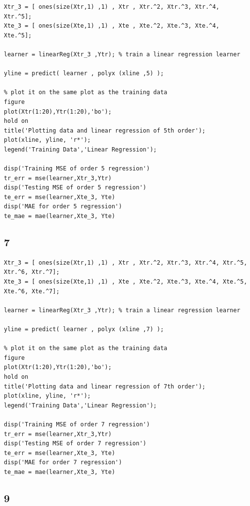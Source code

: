 \documentclass{article}
\begin{document}
\begin{verbatim}
Xtr_3 = [ ones(size(Xtr,1) ,1) , Xtr , Xtr.^2, Xtr.^3, Xtr.^4, Xtr.^5];
Xte_3 = [ ones(size(Xte,1) ,1) , Xte , Xte.^2, Xte.^3, Xte.^4, Xte.^5];

learner = linearReg(Xtr_3 ,Ytr); % train a linear regression learner

yline = predict( learner , polyx (xline ,5) );

% plot it on the same plot as the training data
figure
plot(Xtr(1:20),Ytr(1:20),'bo');
hold on
title('Plotting data and linear regression of 5th order');
plot(xline, yline, 'r*');
legend('Training Data','Linear Regression');

disp('Training MSE of order 5 regression')
tr_err = mse(learner,Xtr_3,Ytr)
disp('Testing MSE of order 5 regression')
te_err = mse(learner,Xte_3, Yte)
disp('MAE for order 5 regression')
te_mae = mae(learner,Xte_3, Yte)
\end{verbatim}


\subsection*{7}

\begin{verbatim}
Xtr_3 = [ ones(size(Xtr,1) ,1) , Xtr , Xtr.^2, Xtr.^3, Xtr.^4, Xtr.^5, Xtr.^6, Xtr.^7];
Xte_3 = [ ones(size(Xte,1) ,1) , Xte , Xte.^2, Xte.^3, Xte.^4, Xte.^5, Xte.^6, Xte.^7];

learner = linearReg(Xtr_3 ,Ytr); % train a linear regression learner

yline = predict( learner , polyx (xline ,7) );

% plot it on the same plot as the training data
figure
plot(Xtr(1:20),Ytr(1:20),'bo');
hold on
title('Plotting data and linear regression of 7th order');
plot(xline, yline, 'r*');
legend('Training Data','Linear Regression');

disp('Training MSE of order 7 regression')
tr_err = mse(learner,Xtr_3,Ytr)
disp('Testing MSE of order 7 regression')
te_err = mse(learner,Xte_3, Yte)
disp('MAE for order 7 regression')
te_mae = mae(learner,Xte_3, Yte)
\end{verbatim}


\subsection*{9}
\end{document}

